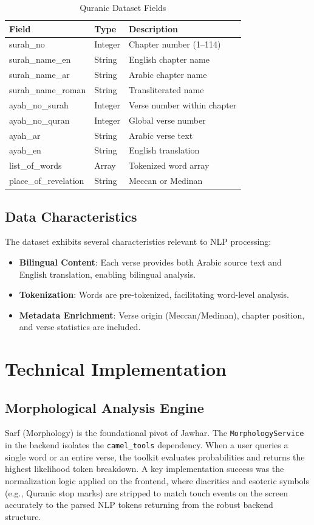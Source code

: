 \documentclass[11pt, a4paper]{article}
\begin{document}
\begin{table}[H]
\centering
\caption{Quranic Dataset Fields}
\label{tab:dataset-fields}
\begin{tabular}{|l|l|p{5cm}|}
\toprule
\textbf{Field} & \textbf{Type} & \textbf{Description} \\
\midrule
surah\_no & Integer & Chapter number (1–114) \\
surah\_name\_en & String & English chapter name \\
surah\_name\_ar & String & Arabic chapter name \\
surah\_name\_roman & String & Transliterated name \\
ayah\_no\_surah & Integer & Verse number within chapter \\
ayah\_no\_quran & Integer & Global verse number \\
ayah\_ar & String & Arabic verse text \\
ayah\_en & String & English translation \\
list\_of\_words & Array & Tokenized word array \\
place\_of\_revelation & String & Meccan or Medinan \\
\bottomrule
\end{tabular}
\end{table}

\subsection{Data Characteristics}
The dataset exhibits several characteristics relevant to NLP processing:
\begin{itemize}
    \item \textbf{Bilingual Content}: Each verse provides both Arabic source text and English translation, enabling bilingual analysis.
    \item \textbf{Tokenization}: Words are pre-tokenized, facilitating word-level analysis.
    \item \textbf{Metadata Enrichment}: Verse origin (Meccan/Medinan), chapter position, and verse statistics are included.
\end{itemize}

\section{Technical Implementation}

\subsection{Morphological Analysis Engine}
Sarf (Morphology) is the foundational pivot of Jawhar. The \texttt{MorphologyService} in the backend isolates the \texttt{camel\_tools} dependency. When a user queries a single word or an entire verse, the toolkit evaluates probabilities and returns the highest likelihood token breakdown. 
A key implementation success was the normalization logic applied on the frontend, where diacritics and esoteric symbols (e.g., Quranic stop marks) are stripped to match touch events on the screen accurately to the parsed NLP tokens returning from the robust backend structure.
\end{document}
